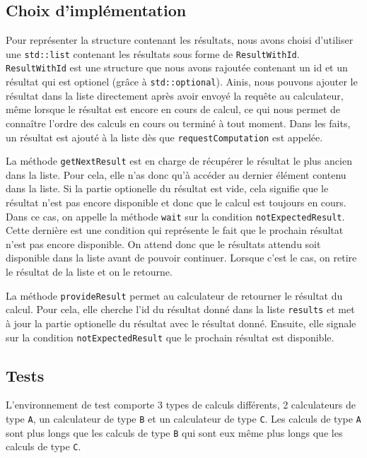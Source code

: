 \documentclass{article}
\begin{document}
\subsection{Choix d'implémentation}
Pour représenter la structure contenant les résultats, nous avons choisi d'utiliser une \texttt{std::list} contenant les
résultats sous forme de \texttt{ResultWithId}. \texttt{ResultWithId} est une structure que nous avons rajoutée
contenant un id et un résultat qui est optionel (grâce à \texttt{std::optional}). Ainis, nous pouvons ajouter le
résultat dans la liste directement après avoir envoyé la requête au calculateur, même lorsque le résultat est encore
en cours de calcul, ce qui nous permet de connaître l'ordre des calculs en cours ou terminé à tout moment. Dans les
faits, un résultat est ajouté à la liste dès que \texttt{requestComputation} est appelée.

La méthode \texttt{getNextResult} est en charge de récupérer le résultat le plus ancien dans la liste. Pour cela, elle
n'as donc qu'à accéder au dernier élément contenu dans la liste. Si la partie optionelle du résultat est vide, cela
signifie que le résultat n'est pas encore disponible et donc que le calcul est toujours en cours. Dans ce cas, on
appelle la méthode \texttt{wait} sur la condition \texttt{notExpectedResult}. Cette dernière est une condition qui
représente le fait que le prochain résultat n'est pas encore disponible. On attend donc que le résultats attendu
soit disponible dans la liste avant de pouvoir continuer. Lorsque c'est le cas, on retire le résultat de la liste et
on le retourne.

La méthode \texttt{provideResult} permet au calculateur de retourner le résultat du calcul. Pour cela, elle cherche
l'id du résultat donné dans la liste \texttt{results} et met à jour la partie optionelle du résultat avec le résultat
donné. Ensuite, elle signale sur la condition \texttt{notExpectedResult} que le prochain résultat est disponible.


\subsection{Tests}
L'environnement de test comporte 3 types de calculs différents, 2 calculateurs de type \texttt{A}, un
calculateur de type \texttt{B} et un calculateur de type \texttt{C}. Les calculs de type \texttt{A} sont plus longs
que les calculs de type \texttt{B} qui sont eux même plus longs que les calculs de type \texttt{C}.
\end{document}
